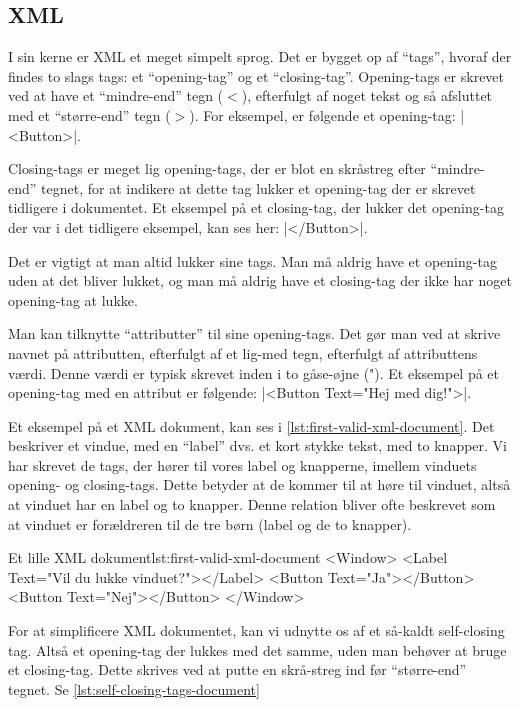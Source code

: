 \subsection{XML}
I sin kerne er XML et meget simpelt sprog. Det er bygget op af ``tags'', hvoraf 
der findes to slags tags: et ``opening-tag'' og et ``closing-tag''. 
Opening-tags er skrevet ved at have et ``mindre-end'' tegn ($<$), efterfulgt af 
noget tekst og så afsluttet med et ``større-end'' tegn ($>$). For eksempel, er 
følgende et opening-tag: \XmlInline|<Button>|.

Closing-tags er meget lig opening-tags, der er blot en skråstreg efter 
``mindre-end'' tegnet, for at indikere at dette tag lukker et opening-tag der 
er skrevet tidligere i dokumentet. Et eksempel på et closing-tag, der lukker 
det opening-tag der var i det tidligere eksempel, kan ses her: 
\XmlInline|</Button>|.

Det er vigtigt at man altid lukker sine tags. Man må aldrig have et opening-tag uden at det bliver lukket, og man må aldrig have et closing-tag der ikke har noget opening-tag at lukke.

Man kan tilknytte ``attributter'' til sine opening-tags. Det gør man ved at 
skrive navnet på attributten, efterfulgt af et lig-med tegn, efterfulgt af 
attributtens værdi. Denne værdi er typisk skrevet inden i to gåse-øjne ("). Et 
eksempel på et opening-tag med en attribut er følgende: 
\XmlInline|<Button Text="Hej med dig!">|.

Et eksempel på et XML dokument, kan ses i \autoref{lst:first-valid-xml-document}. Det beskriver et vindue, med en ``label'' dvs. et kort stykke tekst, med to knapper. Vi har skrevet de tags, der hører til vores label og knapperne, imellem vinduets opening- og closing-tags. Dette betyder at de kommer til at høre til vinduet, altså at vinduet har en label og to knapper. Denne relation bliver ofte beskrevet som at 
vinduet er forældreren til de tre børn (label og de to knapper).

\begin{example}
	\begin{XmlCode}{Et lille XML dokument}{lst:first-valid-xml-document}
		<Window>
			<Label Text="Vil du lukke vinduet?"></Label>
			<Button Text="Ja"></Button>
			<Button Text="Nej"></Button>
		</Window>
	\end{XmlCode}
\end{example}


For at simplificere XML dokumentet, kan vi udnytte os af et så-kaldt 
self-closing tag. Altså et opening-tag der lukkes med det samme, uden man 
behøver at bruge et closing-tag. Dette skrives ved at putte en skrå-streg ind 
før ``større-end'' tegnet. Se \autoref{lst:self-closing-tags-document}

